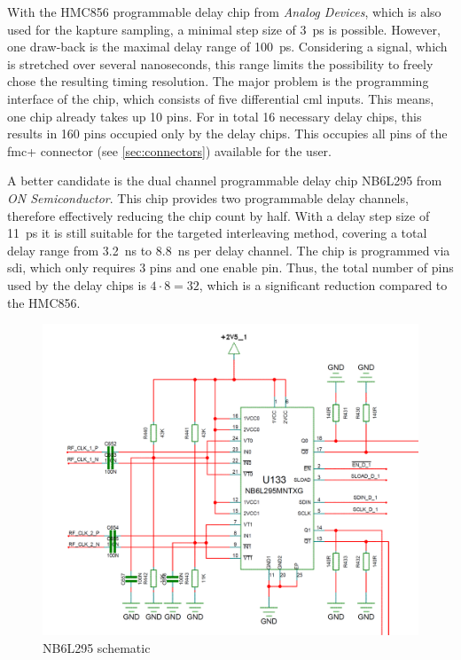 With the HMC856 programmable delay chip from \textit{Analog Devices}, which is also used for the \gls{kapture} sampling, a minimal step size of \SI{3}{\pico \second} \cite{hmc856} is possible. However, one draw-back is the maximal delay range of \SI{100}{\pico \second}. Considering a signal, which is stretched over several nanoseconds, this range limits the possibility to freely chose the resulting timing resolution. The major problem is the programming interface of the chip, which consists of five differential \gls{cml} inputs. This means, one chip already takes up 10 pins. For in total 16 necessary delay chips, this results in 160 pins occupied only by the delay chips. This occupies all pins of the \gls{fmc}+ connector (see \autoref{sec:connectors}) available for the user. 

A better candidate is the dual channel programmable delay chip NB6L295 from \textit{ON Semiconductor}. This chip provides two programmable delay channels, therefore effectively reducing the chip count by half. With a delay step size of \SI{11}{\pico \second} it is still suitable for the targeted interleaving method, covering a total delay range from \SI{3.2}{\nano \second} to \SI{8.8}{\nano \second} per delay channel. The chip is programmed via \gls{sdi}, which only requires 3 pins and one enable pin. Thus, the total number of pins used by the delay chips is $4\cdot8 = 32$, which is a significant reduction compared to the HMC856.

\begin{figure}[tbh]
	\centering
	\includegraphics[width = \textwidth]{chap/04-work/img/delay_chip}
	\caption[NB6L295 Delay Chip Schematic]{NB6L295 schematic}
	\label{fig:nb6l295}
\end{figure}

